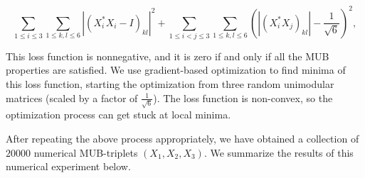 \documentclass[12pt]{amsart}
\numberwithin{equation}{section}
\theoremstyle{definition}
\theoremstyle{remark}
\theoremstyle{remark}
\begin{document}
$$\sum_{1 \leq i \leq 3} \sum_{1 \leq k,l \leq 6} |(X_i^* X_i - I)_{kl}|^2 + \sum_{1 \leq i < j \leq 3} \sum_{1 \leq k,l \leq 6} (|(X_i^* X_j)_{kl}| - \frac{1}{\sqrt 6})^2,$$


This loss function is nonnegative, and it is zero if and only if all the MUB properties are satisfied. We use gradient-based optimization to find minima of this loss function, starting the optimization from three random  unimodular matrices (scaled by a factor of $\frac{1}{\sqrt{6}}$). The loss function is non-convex, so the optimization process can get stuck at local minima. 


\medskip

After repeating the above process appropriately, we have obtained a collection of $20000$ numerical MUB-triplets $(X_1, X_2, X_3)$.
We summarize the results of this numerical experiment below. 
\end{document}

